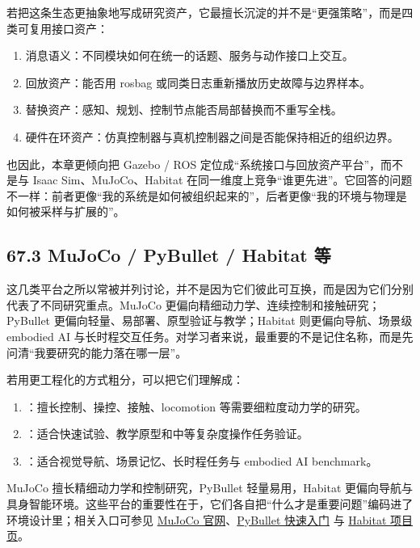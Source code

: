 若把这条生态更抽象地写成研究资产，它最擅长沉淀的并不是“更强策略”，而是四类可复用接口资产：

\begin{enumerate}
\item 消息语义：不同模块如何在统一的话题、服务与动作接口上交互。
\item 回放资产：能否用 rosbag 或同类日志重新播放历史故障与边界样本。
\item 替换资产：感知、规划、控制节点能否局部替换而不重写全栈。
\item 硬件在环资产：仿真控制器与真机控制器之间是否能保持相近的组织边界。
\end{enumerate}

也因此，本章更倾向把 Gazebo / ROS 定位成“系统接口与回放资产平台”，而不是与 Isaac Sim、MuJoCo、Habitat 在同一维度上竞争“谁更先进”。它回答的问题不一样：前者更像“我的系统是如何被组织起来的”，后者更像“我的环境与物理是如何被采样与扩展的”。

\subsection*{67.3 MuJoCo / PyBullet / Habitat 等}


这几类平台之所以常被并列讨论，并不是因为它们彼此可互换，而是因为它们分别代表了不同研究重点。MuJoCo 更偏向精细动力学、连续控制和接触研究；PyBullet 更偏向轻量、易部署、原型验证与教学；Habitat 则更偏向导航、场景级 embodied AI 与长时程交互任务。对学习者来说，最重要的不是记住名称，而是先问清“我要研究的能力落在哪一层”。

若用更工程化的方式粗分，可以把它们理解成：

\begin{enumerate}
\item \texttt{}：擅长控制、操控、接触、locomotion 等需要细粒度动力学的研究。
\item \texttt{}：适合快速试验、教学原型和中等复杂度操作任务验证。
\item \texttt{}：适合视觉导航、场景记忆、长时程任务与 embodied AI benchmark。
\end{enumerate}

MuJoCo 擅长精细动力学和控制研究，PyBullet 轻量易用，Habitat 更偏向导航与具身智能环境。这些平台的重要性在于，它们各自把“什么才是重要问题”编码进了环境设计里；相关入口可参见 \href{https://mujoco.org/}{MuJoCo 官网}、\href{https://pybullet.org/wordpress/}{PyBullet 快速入门} 与 \href{https://aihabitat.org/}{Habitat 项目页}。

